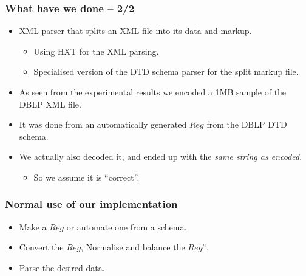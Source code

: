 \documentclass[slidestop,compress,mathserif, xcolor=table]{beamer}
\begin{document}
\begin{frame}[c]
  \frametitle{What have we done -- 2/2}
  \begin{itemize}

  \item XML parser that splits an XML file into its data and markup.
    \begin{itemize}
      
    \item Using HXT for the XML parsing.
    \item Specialised version of the DTD schema parser for the split markup
      file.
    \end{itemize}
  \item As seen from the experimental results we encoded a 1MB sample of the
    DBLP XML file.
    
    
  \item It was done from an automatically generated $Reg$ from the DBLP DTD schema.

  \item We actually also decoded it, and ended up with the
    \emph{same string as encoded}.
    
    \begin{itemize}
    \item So we assume it is ``correct''.
    \end{itemize}

  \end{itemize}
\end{frame}

\begin{frame}[c]
  \frametitle{Normal use of our implementation}
  \begin{itemize}

  \item Make a $Reg$ or automate one from a schema.

  \item Convert the $Reg$, Normalise and balance the $Reg^\mu$.

  \item Parse the desired data.

  \end{itemize}
\end{frame}
\end{document}
